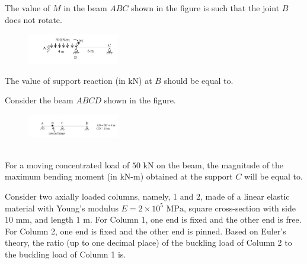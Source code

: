 \item
The value of $M$ in the beam $ABC$ shown in the figure is such that the joint $B$ does not rotate. \\
     \begin{figure}[!ht]
    \centering
    \includegraphics[width=4cm]{./GATE-yearwise/2017/figs/Q40.png}
    \end{figure}
The value of support reaction (in kN) at $B$ should be equal to.

\item
Consider the beam $ABCD$ shown in the figure.\\
     \begin{figure}[!ht]
    \centering
    \includegraphics[width=4cm]{./GATE-yearwise/2017/figs/Q41.png}
    \end{figure}\\
For a moving concentrated load of $50 \text{ kN}$ on the beam, the magnitude of the maximum bending moment (in kN-m) obtained at the support $C$ will be equal to.

\item
Consider two axially loaded columns, namely, 1 and 2, made of a linear elastic material with Young's modulus $E = 2 \times 10^5 \text{ MPa}$, square cross-section with side $10 \text{ mm}$, and length $1 \text{ m}$. For Column 1, one end is fixed and the other end is free. For Column 2, one end is fixed and the other end is pinned. Based on Euler's theory, the ratio (up to one decimal place) of the buckling load of Column 2 to the buckling load of Column 1 is.

